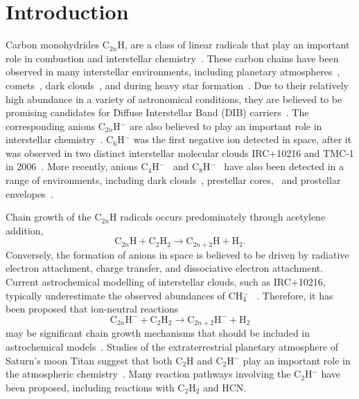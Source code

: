 \documentclass[aip,graphicx]{revtex4-1}
\begin{document}
\maketitle 

\section{Introduction}
Carbon monohydrides C$_{2n}$H, are a class of linear radicals that play an important role in combustion and interstellar chemistry~\cite{kie90,kie92,bou96,wil91,vui01}. These carbon chains have been observed in many interstellar environments, including planetary atmospheres~\cite{vui01,wil03,dob16}, comets~\cite{jac96}, dark clouds~\cite{ziu82,gup09}, and during heavy star formation~\cite{beu08,jia15}. Due to their relatively high abundance in a variety of astronomical conditions, they are believed to be promising candidates for Diffuse Interstellar Band (DIB) carriers~\cite{dou77,ful93,wat94,ful00,sch05,gup09}. The corresponding anions C$_{2n}$H$^-$ are also believed to play an important role in interstellar chemistry~\cite{mil17,gup09}. C$_6$H$^-$ was the first negative ion detected in space, after it was observed in two distinct interstellar molecular clouds IRC+10216 and TMC-1 in 2006~\cite{mcc06}. More recently, anions C$_4$H$^-$~\cite{cer07} and C$_8$H$^-$~\cite{bru07,rem07} have also been detected in a range of environments, including dark clouds~\cite{cor13}, prestellar cores,~\cite{sak10} and prostellar envelopes~\cite{sak07}.

Chain growth of the C$_{2n}$H radicals occurs predominately through acetylene addition,~\cite{wil03}
\begin{equation}
\text{C}_{2n}\text{H} + \text{C}_2\text{H}_2 \rightarrow \text{C}_{2n+2}\text{H}+\text{H}_2.
\label{eq:1}
\end{equation}
Conversely, the formation of anions in space is believed to be driven by radiative electron attachment, charge transfer, and dissociative electron attachment. Current astrochemical modelling of interstellar clouds, such as IRC+10216, typically underestimate the observed abundances of CH$_4^-$ ~\cite{mil17,cor13,her08}. Therefore, it has been proposed that ion-neutral reactions
\begin{equation}
\text{C}_{2n}\text{H}^- + \text{C}_2\text{H}_2 \rightarrow \text{C}_{2n+2}\text{H}^- + \text{H}_2
\label{eq:2}
\end{equation}
may be significant chain growth mechanisms that should be included in astrochemical models~\cite{mil17,bas19}. Studies of the extraterrestrial planetary atmosphere of Saturn's moon Titan suggest that both C$_2$H and C$_2$H$^-$ play an important role in the atmospheric chemistry~\cite{dob16,vui09,des17,vri18}. Many reaction pathways involving the C$_2$H$^-$ have been proposed, including reactions with C$_2$H$_2$ and HCN. 
\end{document}
